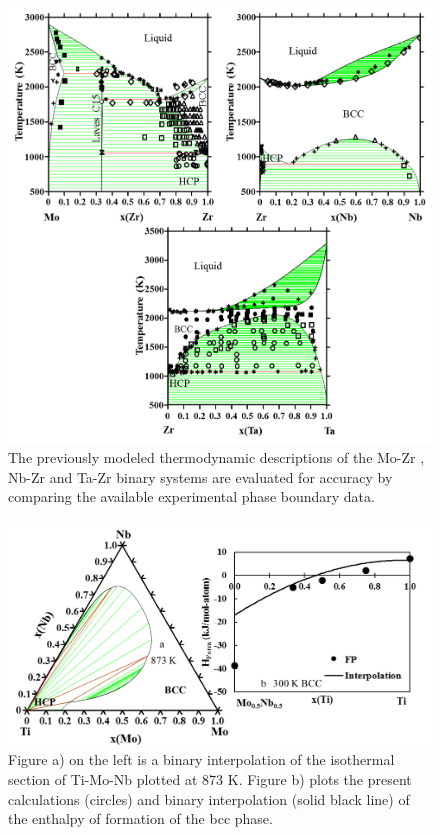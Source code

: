 \newpage
\begin{figure}[H]
	\centering
	\includegraphics[width=\textwidth]{Chapter-3/Figures/binary2.png}
	\caption{The previously modeled thermodynamic descriptions of the Mo-Zr \cite{Perez2003}, Nb-Zr \cite{Guillermet1991,Abriata1982} and Ta-Zr \cite{Guillermet1995} binary systems are evaluated for accuracy by comparing the available experimental phase boundary data.}
	\label{Ch3-figure:binary2}
\end{figure}

\newpage
\begin{figure}[H]
	\centering
	\includegraphics[width=\textwidth]{Chapter-3/Figures/TiMoNb.png}
	\caption{Figure a) on the left is a binary interpolation of the isothermal section of Ti-Mo-Nb plotted at 873 K. Figure b) plots the present calculations (circles) and binary interpolation (solid black line) of the enthalpy of formation of the bcc phase.}
	\label{Ch3-figure:TiMoNb}
\end{figure}

